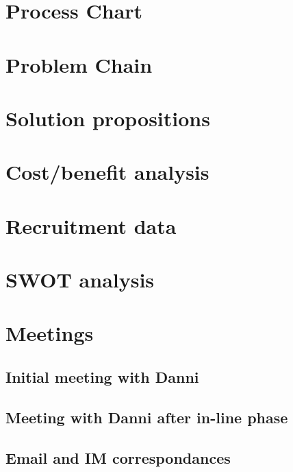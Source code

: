 \chapter{Process Chart}

\chapter{Problem Chain}

\chapter{Solution propositions}

\chapter{Cost/benefit analysis}

\chapter{Recruitment data}

\chapter{SWOT analysis}

\chapter{Meetings}
\section{Initial meeting with Danni}

\section{Meeting with Danni after in-line phase}

\section{Email and IM correspondances}

